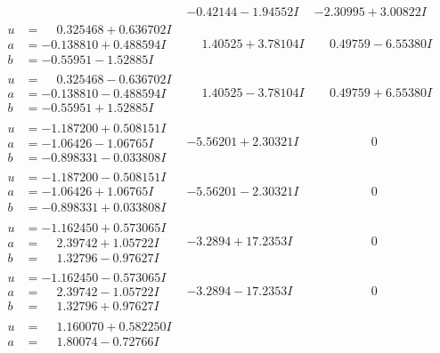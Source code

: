 \documentclass[1p]{elsarticle_modified}
\theoremstyle{definition}
\begin{document}
$$\begin{array}{c|c|c}
 & -0.42144 - 1.94552 I & -2.30995 + 3.00822 I \\ \hline\begin{aligned}
u &= \phantom{-}0.325468 + 0.636702 I \\
a &= -0.138810 + 0.488594 I \\
b &= -0.55951 - 1.52885 I\end{aligned}
 & \phantom{-}1.40525 + 3.78104 I & \phantom{-}0.49759 - 6.55380 I \\ \hline\begin{aligned}
u &= \phantom{-}0.325468 - 0.636702 I \\
a &= -0.138810 - 0.488594 I \\
b &= -0.55951 + 1.52885 I\end{aligned}
 & \phantom{-}1.40525 - 3.78104 I & \phantom{-}0.49759 + 6.55380 I \\ \hline\begin{aligned}
u &= -1.187200 + 0.508151 I \\
a &= -1.06426 - 1.06765 I \\
b &= -0.898331 - 0.033808 I\end{aligned}
 & -5.56201 + 2.30321 I & \phantom{-0.000000 } 0 \\ \hline\begin{aligned}
u &= -1.187200 - 0.508151 I \\
a &= -1.06426 + 1.06765 I \\
b &= -0.898331 + 0.033808 I\end{aligned}
 & -5.56201 - 2.30321 I & \phantom{-0.000000 } 0 \\ \hline\begin{aligned}
u &= -1.162450 + 0.573065 I \\
a &= \phantom{-}2.39742 + 1.05722 I \\
b &= \phantom{-}1.32796 - 0.97627 I\end{aligned}
 & -3.2894 + 17.2353 I & \phantom{-0.000000 } 0 \\ \hline\begin{aligned}
u &= -1.162450 - 0.573065 I \\
a &= \phantom{-}2.39742 - 1.05722 I \\
b &= \phantom{-}1.32796 + 0.97627 I\end{aligned}
 & -3.2894 - 17.2353 I & \phantom{-0.000000 } 0 \\ \hline\begin{aligned}
u &= \phantom{-}1.160070 + 0.582250 I \\
a &= \phantom{-}1.80074 - 0.72766 I \\

\end{aligned}
\end{array}$$
\end{document}
